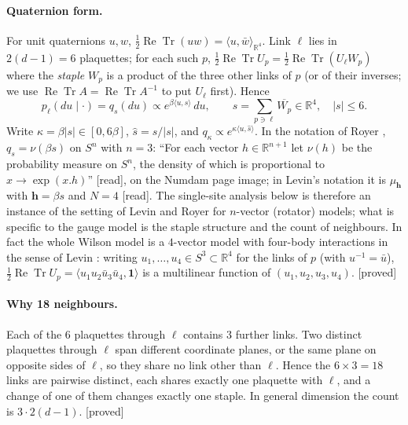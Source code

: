 \documentclass[11pt,a4paper]{article}
\theoremstyle{remark}
\theoremstyle{definition}
\newcommand{\R}{\mathbb{R}}
\newcommand{\ReTr}{\operatorname{Re}\operatorname{Tr}}
\newcommand{\st}[1]{\textsf{[#1]}}
\begin{document}
\paragraph{Quaternion form.} For unit quaternions $u,w$, $\tfrac12\ReTr(uw)=\langle u,\bar w\rangle_{\R^4}$.
Link $\ell$ lies in $2(d-1)=6$ plaquettes; for each such $p$, $\tfrac12\ReTr U_p=\tfrac12\ReTr(U_\ell W_p)$
where the \emph{staple} $W_p$ is a product of the three other links of $p$ (or of their inverses; we use
$\ReTr A=\ReTr A^{-1}$ to put $U_\ell$ first). Hence
\begin{equation}\label{eq:q}
  p_\ell(du\mid\cdot)=q_s(du)\propto e^{\beta\langle u,s\rangle}\,du,\qquad
  s=\sum_{p\ni\ell}\overline{W_p}\in\R^4,\quad |s|\le 6 .
\end{equation}
Write $\kappa=\beta|s|\in[0,6\beta]$, $\hat s=s/|s|$, and $q_\kappa\propto e^{\kappa\langle u,\hat s\rangle}$.
In the notation of Royer \cite[p.~31]{Roy86}, $q_s=\nu(\beta s)$ on $S^n$ with $n=3$: ``For each vector
$h\in\R^{n+1}$ let $\nu(h)$ be the probability measure on $S^n$, the density of which is proportional to
$x\to\exp(x.h)$'' \st{read}, on the Numdam page image; in Levin's notation \cite[(3.11), p.~68]{Lev80} it is
$\mu_{\mathbf h}$ with $\mathbf h=\beta s$ and $N=4$ \st{read}. The single-site analysis below is therefore an
instance of the setting of Levin \cite{Lev80} and Royer \cite{Roy86} for $n$-vector (rotator) models; what
is specific to the gauge model is the staple structure and the count of neighbours. In fact the whole
Wilson model is a $4$-vector model with four-body interactions in the sense of Levin
\cite[Remark~3.6, (3.48), p.~73]{Lev80}: writing $u_1,\dots,u_4\in S^3\subset\R^4$ for the links of $p$ (with
$u^{-1}=\bar u$), $\tfrac12\ReTr U_p=\langle u_1u_2\bar u_3\bar u_4,\mathbf 1\rangle$ is a multilinear function of
$(u_1,u_2,u_3,u_4)$. \st{proved}

\paragraph{Why 18 neighbours.} Each of the $6$ plaquettes through $\ell$ contains $3$ further links.
Two distinct plaquettes through $\ell$ span different coordinate planes, or the same plane on opposite
sides of $\ell$, so they share no link other than $\ell$. Hence the $6\times3=18$ links are pairwise
distinct, each shares exactly one plaquette with $\ell$, and a change of one of them changes exactly one
staple. In general dimension the count is $3\cdot2(d-1)$. \st{proved}
\end{document}
